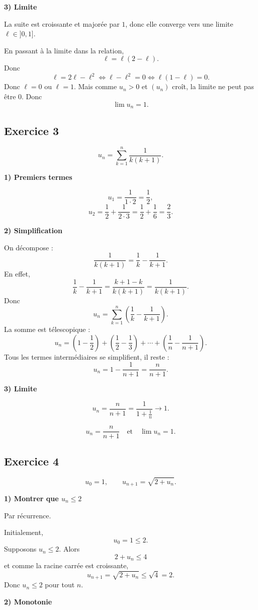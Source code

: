 \documentclass[11pt,a4paper]{article}
\begin{document}
\textbf{3) Limite}

La suite est croissante et majorée par \(1\), donc elle converge vers une limite \(\ell\in ]0,1]\).

En passant à la limite dans la relation,
\[
\ell=\ell(2-\ell).
\]
Donc
\[
\ell=2\ell-\ell^2
\iff \ell-\ell^2=0
\iff \ell(1-\ell)=0.
\]
Donc \(\ell=0\) ou \(\ell=1\).  
Mais comme \(u_n>0\) et \((u_n)\) croît, la limite ne peut pas être \(0\). Donc
\[
\boxed{\lim u_n=1.}
\]

\subsection*{Exercice 3}
\[
u_n=\sum_{k=1}^n \frac{1}{k(k+1)}.
\]

\textbf{1) Premiers termes}

\[
u_1=\frac{1}{1\cdot2}=\frac12,
\]
\[
u_2=\frac12+\frac{1}{2\cdot3}=\frac12+\frac16=\frac23.
\]

\textbf{2) Simplification}

On décompose :
\[
\frac{1}{k(k+1)}=\frac{1}{k}-\frac{1}{k+1}.
\]
En effet,
\[
\frac{1}{k}-\frac{1}{k+1}
=\frac{k+1-k}{k(k+1)}
=\frac{1}{k(k+1)}.
\]
Donc
\[
u_n=\sum_{k=1}^n \left(\frac{1}{k}-\frac{1}{k+1}\right).
\]
La somme est télescopique :
\[
u_n=\left(1-\frac12\right)+\left(\frac12-\frac13\right)+\cdots+\left(\frac1n-\frac{1}{n+1}\right).
\]
Tous les termes intermédiaires se simplifient, il reste :
\[
u_n=1-\frac{1}{n+1}=\frac{n}{n+1}.
\]

\textbf{3) Limite}

\[
u_n=\frac{n}{n+1}=\frac{1}{1+\frac1n}\longrightarrow 1.
\]

\[
\boxed{u_n=\frac{n}{n+1}\quad \text{et} \quad \lim u_n=1.}
\]

\subsection*{Exercice 4}
\[
u_0=1,\qquad u_{n+1}=\sqrt{2+u_n}.
\]

\textbf{1) Montrer que \(u_n\leq 2\)}

Par récurrence.

Initialement,
\[
u_0=1\leq 2.
\]
Supposons \(u_n\leq 2\). Alors
\[
2+u_n\leq 4
\]
et comme la racine carrée est croissante,
\[
u_{n+1}=\sqrt{2+u_n}\leq \sqrt4=2.
\]
Donc \(u_n\leq 2\) pour tout \(n\).

\textbf{2) Monotonie}
\end{document}
